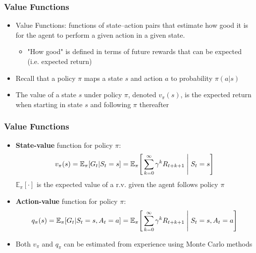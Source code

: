\documentclass{beamer}
\begin{document}

\begin{frame}
\frametitle{Value Functions}
\begin{itemize}
\item Value Functions: functions of state--action pairs that estimate how good it is for the agent to perform a given action in a given state. 
   \begin{itemize}
   	\item "How good" is defined in terms of future rewards that can be expected (i.e. expected return)
      \end{itemize}
\item Recall that a policy $\pi$ maps a state $s$ and action $a$ to probability $\pi(a|s)$
\item The value of a state $s$ under policy $\pi$, denoted $v_\pi(s)$, is the expected return when starting in state $s$ and following $\pi$ thereafter

\end{itemize}
\end{frame}


\begin{frame}
\frametitle{Value Functions}
\begin{itemize}
\item \textbf{State-value} function for policy $\pi$:
\begin{equation}
v_\pi(s) = \mathbb{E}_\pi[G_t | S_t = s] = \mathbb{E}_\pi\Bigg[\sum_{k=0}^{\infty} \gamma^k R_{t+k+1} \Biggm\lvert S_t = s \Bigg]
\nonumber
\end{equation}
$\mathbb{E}_\pi[\cdot]$ is the expected value of a r.v. given the agent follows policy $\pi$
\item \textbf{Action-value} function for policy $\pi$:
\begin{equation}
q_\pi(s) = \mathbb{E}_\pi[G_t | S_t = s, A_t = a] = \mathbb{E}_\pi\Bigg[\sum_{k=0}^{\infty} \gamma^k R_{t+k+1} \Biggm\lvert S_t = s, A_t = a \Bigg]
\nonumber
\end{equation}
\item Both $v_\pi$ and $q_\pi$ can be estimated from experience using Monte Carlo methods
\end{itemize}
\end{frame}
\end{document}
